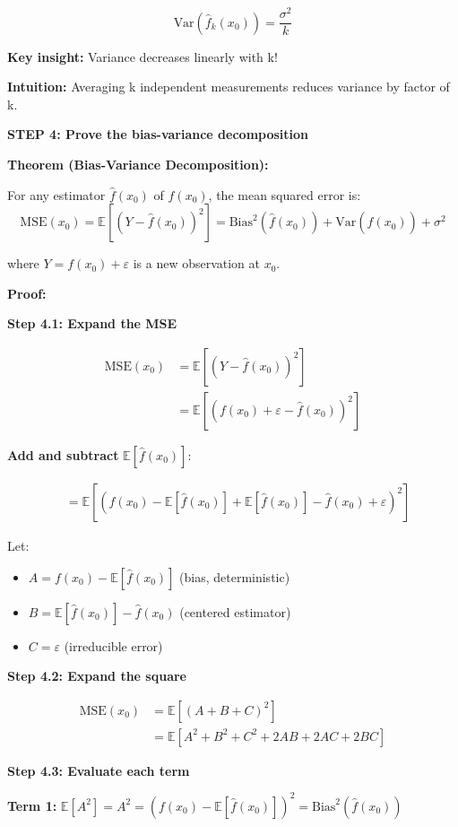 \documentclass[12pt]{article}
\begin{document}
\begin{solution}
\[
\boxed{\text{Var}(\hat{f}_k(x_0)) = \frac{\sigma^2}{k}}
\]

\textbf{Key insight:} Variance decreases linearly with k!

\textbf{Intuition:} Averaging k independent measurements reduces variance by factor of k.

\textbf{STEP 4: Prove the bias-variance decomposition}

\textbf{Theorem (Bias-Variance Decomposition):}

For any estimator $\hat{f}(x_0)$ of $f(x_0)$, the mean squared error is:
\[
\text{MSE}(x_0) = \mathbb{E}[(Y - \hat{f}(x_0))^2] = \text{Bias}^2(\hat{f}(x_0)) + \text{Var}(\hat{f}(x_0)) + \sigma^2
\]

where $Y = f(x_0) + \varepsilon$ is a new observation at $x_0$.

\textbf{Proof:}

\textbf{Step 4.1: Expand the MSE}

\begin{align*}
\text{MSE}(x_0) &= \mathbb{E}[(Y - \hat{f}(x_0))^2] \\
&= \mathbb{E}[(f(x_0) + \varepsilon - \hat{f}(x_0))^2]
\end{align*}

\textbf{Add and subtract } $\mathbb{E}[\hat{f}(x_0)]$:

\begin{align*}
&= \mathbb{E}[(f(x_0) - \mathbb{E}[\hat{f}(x_0)] + \mathbb{E}[\hat{f}(x_0)] - \hat{f}(x_0) + \varepsilon)^2]
\end{align*}

Let:
\begin{itemize}
    \item $A = f(x_0) - \mathbb{E}[\hat{f}(x_0)]$ (bias, deterministic)
    \item $B = \mathbb{E}[\hat{f}(x_0)] - \hat{f}(x_0)$ (centered estimator)
    \item $C = \varepsilon$ (irreducible error)
\end{itemize}

\textbf{Step 4.2: Expand the square}

\begin{align*}
\text{MSE}(x_0) &= \mathbb{E}[(A + B + C)^2] \\
&= \mathbb{E}[A^2 + B^2 + C^2 + 2AB + 2AC + 2BC]
\end{align*}

\textbf{Step 4.3: Evaluate each term}

\textbf{Term 1:} $\mathbb{E}[A^2] = A^2 = (f(x_0) - \mathbb{E}[\hat{f}(x_0)])^2 = \text{Bias}^2(\hat{f}(x_0))$


\end{solution}
\end{document}
